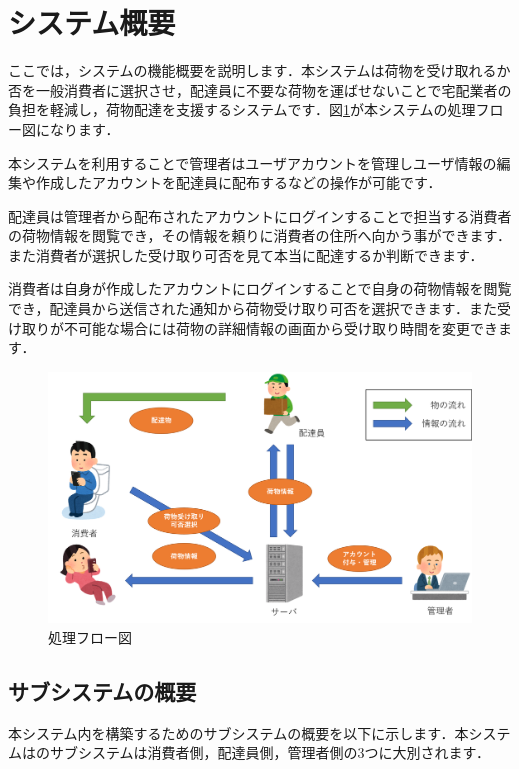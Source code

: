 \documentclass[a4j,titlepage]{jarticle}
\begin{document}
\section{システム概要}
ここでは，システムの機能概要を説明します．本システムは荷物を受け取れるか否を一般消費者に選択させ，配達員に不要な荷物を運ばせないことで宅配業者の負担を軽減し，荷物配達を支援するシステムです．図\ref{fig:SysSch}が本システムの処理フロー図になります． 

本システムを利用することで管理者はユーザアカウントを管理しユーザ情報の編集や作成したアカウントを配達員に配布するなどの操作が可能です．

配達員は管理者から配布されたアカウントにログインすることで担当する消費者の荷物情報を閲覧でき，その情報を頼りに消費者の住所へ向かう事ができます．また消費者が選択した受け取り可否を見て本当に配達するか判断できます．

消費者は自身が作成したアカウントにログインすることで自身の荷物情報を閲覧でき，配達員から送信された通知から荷物受け取り可否を選択できます．また受け取りが不可能な場合には荷物の詳細情報の画面から受け取り時間を変更できます．

\begin{figure}[H]
 \begin{center}
  \includegraphics[width=150mm]{System_Schematic.png}
	\caption{処理フロー図}
	\label{fig:SysSch}
 \end{center}
\end{figure}

\subsection{サブシステムの概要}
本システム内を構築するためのサブシステムの概要を以下に示します．本システムはのサブシステムは消費者側，配達員側，管理者側の3つに大別されます．
\end{document}
